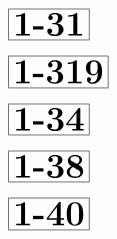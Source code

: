 \documentclass[a4paper, 10pt]{article}
\begin{document}
\begin{minipage}[t]{0.15\textwidth}
                \vspace*{-1.59cm}
        \hspace*{0.75cm}
        $\boxed{\textbf{\Huge1-31}}$
\end{minipage}
\begin{minipage}[t]{0.85\textwidth}
    
\end{minipage}

\begin{minipage}[t]{0.15\textwidth}
                \vspace*{-1.59cm}
        \hspace*{0.25cm}
        $\boxed{\textbf{\Huge1-319}}$
\end{minipage}
\begin{minipage}[t]{0.85\textwidth}
    
\end{minipage}

\begin{minipage}[t]{0.15\textwidth}
                \vspace*{-1.59cm}
        \hspace*{0.75cm}
        $\boxed{\textbf{\Huge1-34}}$
\end{minipage}
\begin{minipage}[t]{0.85\textwidth}
    
\end{minipage}

\begin{minipage}[t]{0.15\textwidth}
                \vspace*{-1.59cm}
        \hspace*{0.75cm}
        $\boxed{\textbf{\Huge1-38}}$
\end{minipage}
\begin{minipage}[t]{0.85\textwidth}
    
\end{minipage}

\begin{minipage}[t]{0.15\textwidth}
                \vspace*{-1.59cm}
        \hspace*{0.75cm}
        $\boxed{\textbf{\Huge1-40}}$
\end{minipage}
\begin{minipage}[t]{0.85\textwidth}
    
\end{minipage}
\end{document}
